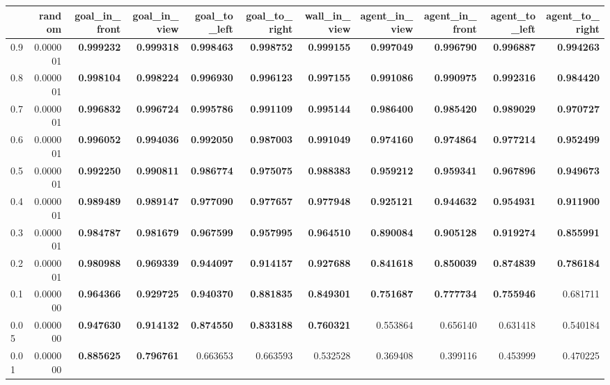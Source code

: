 \begin{tabular}{lrrrrrrrrrr}
\toprule
 & random & goal\_in\_front & goal\_in\_view & goal\_to\_left & goal\_to\_right & wall\_in\_view & agent\_in\_view & agent\_in\_front & agent\_to\_left & agent\_to\_right \\
\midrule
0.9 & 0.000001 & \bfseries 0.999232 & \bfseries 0.999318 & \bfseries 0.998463 & \bfseries 0.998752 & \bfseries 0.999155 & \bfseries 0.997049 & \bfseries 0.996790 & \bfseries 0.996887 & \bfseries 0.994263 \\
0.8 & 0.000001 & \bfseries 0.998104 & \bfseries 0.998224 & \bfseries 0.996930 & \bfseries 0.996123 & \bfseries 0.997155 & \bfseries 0.991086 & \bfseries 0.990975 & \bfseries 0.992316 & \bfseries 0.984420 \\
0.7 & 0.000001 & \bfseries 0.996832 & \bfseries 0.996724 & \bfseries 0.995786 & \bfseries 0.991109 & \bfseries 0.995144 & \bfseries 0.986400 & \bfseries 0.985420 & \bfseries 0.989029 & \bfseries 0.970727 \\
0.6 & 0.000001 & \bfseries 0.996052 & \bfseries 0.994036 & \bfseries 0.992050 & \bfseries 0.987003 & \bfseries 0.991049 & \bfseries 0.974160 & \bfseries 0.974864 & \bfseries 0.977214 & \bfseries 0.952499 \\
0.5 & 0.000001 & \bfseries 0.992250 & \bfseries 0.990811 & \bfseries 0.986774 & \bfseries 0.975075 & \bfseries 0.988383 & \bfseries 0.959212 & \bfseries 0.959341 & \bfseries 0.967896 & \bfseries 0.949673 \\
0.4 & 0.000001 & \bfseries 0.989489 & \bfseries 0.989147 & \bfseries 0.977090 & \bfseries 0.977657 & \bfseries 0.977948 & \bfseries 0.925121 & \bfseries 0.944632 & \bfseries 0.954931 & \bfseries 0.911900 \\
0.3 & 0.000001 & \bfseries 0.984787 & \bfseries 0.981679 & \bfseries 0.967599 & \bfseries 0.957995 & \bfseries 0.964510 & \bfseries 0.890084 & \bfseries 0.905128 & \bfseries 0.919274 & \bfseries 0.855991 \\
0.2 & 0.000001 & \bfseries 0.980988 & \bfseries 0.969339 & \bfseries 0.944097 & \bfseries 0.914157 & \bfseries 0.927688 & \bfseries 0.841618 & \bfseries 0.850039 & \bfseries 0.874839 & \bfseries 0.786184 \\
0.1 & 0.000000 & \bfseries 0.964366 & \bfseries 0.929725 & \bfseries 0.940370 & \bfseries 0.881835 & \bfseries 0.849301 & \bfseries 0.751687 & \bfseries 0.777734 & \bfseries 0.755946 & 0.681711 \\
0.05 & 0.000000 & \bfseries 0.947630 & \bfseries 0.914132 & \bfseries 0.874550 & \bfseries 0.833188 & \bfseries 0.760321 & 0.553864 & 0.656140 & 0.631418 & 0.540184 \\
0.01 & 0.000000 & \bfseries 0.885625 & \bfseries 0.796761 & 0.663653 & 0.663593 & 0.532528 & 0.369408 & 0.399116 & 0.453999 & 0.470225 \\
\bottomrule
\end{tabular}